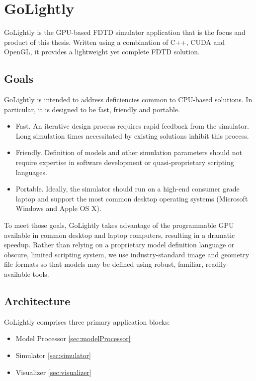 \chapter{GoLightly} \label{ch:golightly}

GoLightly is the GPU-based FDTD simulator application that is the focus and product of this thesis. Written using a combination of C++, CUDA and OpenGL, it provides a lightweight yet complete FDTD solution.

\section{Goals}

GoLightly is intended to address deficiencies common to CPU-based solutions. In particular, it is designed to be fast, friendly and portable.


\begin{itemize}
	\item Fast. An iterative design process requires rapid feedback from the simulator. Long simulation times necessitated by existing solutions inhibit this process.
	\item Friendly. Definition of models and other simulation parameters should not require expertise in software development or quasi-proprietary scripting languages. 
	\item Portable. Ideally, the simulator should run on a high-end consumer grade laptop and support the most common desktop operating systems (Microsoft Windows and Apple OS X).  
\end{itemize}

To meet those goals, GoLightly takes advantage of the programmable GPU available in common desktop and laptop computers, resulting in a dramatic speedup. Rather than relying on a proprietary model definition language or obscure, limited scripting system, we use industry-standard image and geometry file formats so that models may be defined using robust, familiar, readily-available tools. 

\section{Architecture}

GoLightly comprises three primary application blocks:

\begin{itemize}
	\item Model Processor \ref{sec:modelProcessor}
	\item Simulator \ref{sec:simulator}
	\item Visualizer \ref{sec:visualizer}
\end{itemize}

